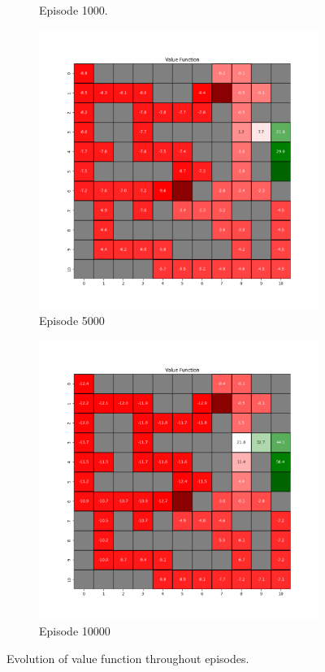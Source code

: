 \documentclass{assignment}
\begin{document}
\begin{figure}[H]
\begin{subfigure}{0.3\textwidth}
    \caption{Episode 1000.}
    \end{subfigure}\hfill
    \begin{subfigure}{0.3\textwidth}
        \includegraphics[width=\textwidth]{figures/value_q/alpha_sweep/value_function_alpha_0.001_gamma_0.95_epsilon_0.2_iteration_5000.png}
    \caption{Episode 5000}
    \end{subfigure}\hfill
    \begin{subfigure}{0.3\textwidth}
        \includegraphics[width=\textwidth]{figures/value_q/alpha_sweep/value_function_alpha_0.001_gamma_0.95_epsilon_0.2_iteration_10000.png}
    \caption{Episode 10000}
    \end{subfigure}
    \caption{Evolution of value function throughout episodes.}
    \label{fig:alpha_0.001_q_learning_value}
\end{figure}
\end{document}
